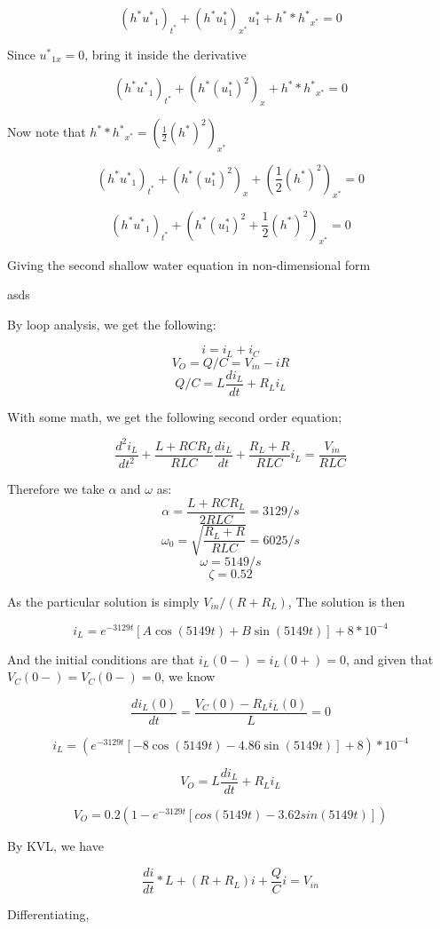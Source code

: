 \documentclass{article}
\begin{document}
$$ (h^*{u^*}_1)_{t^*} + (h^*u^*_1)_{x^*} u^*_1   +  h^**{h^*}_{x^*}  = 0   $$

Since ${u^*}_{1x} = 0$, bring it inside the derivative

$$ (h^*{u^*}_1)_{t^*} + (h^* (u^*_1)^2)_x   + h^**{h^*}_{x^*}  = 0   $$

Now note that $h^**{h^*}_{x^*} = ({\frac{1}{2}(h^*)^2})_{x^*}$

$$ (h^*{u^*}_1)_{t^*} + (h^* (u^*_1)^2)_x   + ({\frac{1}{2}(h^*)^2})_{x^*}  = 0   $$

$$ (h^*{u^*}_1)_{t^*} + (h^* (u^*_1)^2+{\frac{1}{2}(h^*)^2})_{x^*}  = 0   $$

Giving the second shallow water equation in non-dimensional form

\vspace{13cm}

asds

By loop analysis, we get the following:

$$i = i_L + i_C$$
$$V_O = Q/C = V_{in} -iR$$
$$Q/C = L \frac{di_L}{dt} + R_L i_L$$

With some math, we get the following second order equation;

$$\frac{d^2i_L}{dt^2} + \frac{L+RCR_L}{RLC} \frac{di_L}{dt} + \frac{R_L+R}{RLC} i_L = \frac{V_{in}}{RLC}$$

Therefore we take $\alpha$ and $\omega$ as: 
$$\alpha =  \frac{L+RCR_L}{2RLC} = 3129/s$$
$$\omega_0 = \sqrt{\frac{R_L+R}{RLC}} = 6025/s$$ 
$$\omega =  5149/s$$
$$\zeta = 0.52$$

As the particular solution is simply $V_{in}/(R+R_L)$, The solution is then

$$i_L = e^{-3129t} [A\cos(5149t)+B\sin(5149t)] + 8*10^{-4}$$

And the initial conditions are that $i_L(0-) = i_L(0+) = 0$, and given that $V_C(0-)  = V_C(0-) = 0$, we know

$$\frac{di_L(0)}{dt} = \frac{V_C(0)  -R_Li_L(0)}{L }  = 0 $$

$$i_L = (e^{-3129t} [-8\cos(5149t)-4.86\sin(5149t)] + 8)*10^{-4}$$

$$V_O = L \frac{di_L}{dt} + R_L i_L$$

$$V_O = 0.2(1-e^{-3129t}[cos(5149t)-3.62sin(5149t)]) $$

\vspace{5cm}

By KVL, we have

$$\frac{di}{dt}*L + (R+R_L)i + \frac{Q}{C} i = V_{in}$$

Differentiating, 
\end{document}
